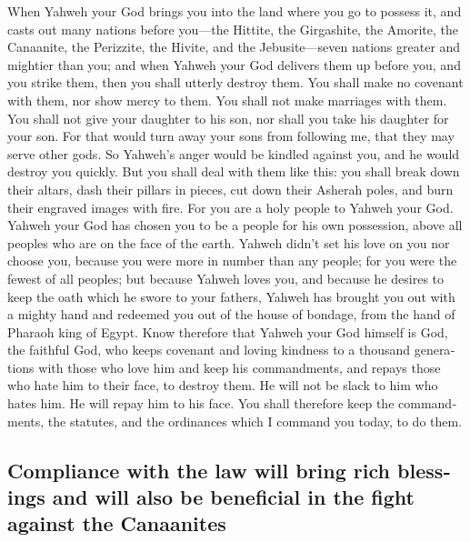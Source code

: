 \begin{paracol}{2}
\begin{otherlanguage}{english}
 When Yahweh your God brings you into the land where you
go to possess it, and casts out many nations before you---the Hittite,
the Girgashite, the Amorite, the Canaanite, the Perizzite, the Hivite,
and the Jebusite---seven nations greater and mightier than you;
 and when Yahweh your God delivers them up before you, and
you strike them, then you shall utterly destroy them. You shall make no
covenant with them, nor show mercy to them.  You shall not
make marriages with them. You shall not give your daughter to his son,
nor shall you take his daughter for your son.  For that
would turn away your sons from following me, that they may serve other
gods. So Yahweh's anger would be kindled against you, and he would
destroy you quickly.  But you shall deal with them like
this: you shall break down their altars, dash their pillars in pieces,
cut down their Asherah poles, and burn their engraved images with fire.
 For you are a holy people to Yahweh your God. Yahweh your
God has chosen you to be a people for his own possession, above all
peoples who are on the face of the earth.  Yahweh didn't
set his love on you nor choose you, because you were more in number than
any people; for you were the fewest of all peoples;  but
because Yahweh loves you, and because he desires to keep the oath which
he swore to your fathers, Yahweh has brought you out with a mighty hand
and redeemed you out of the house of bondage, from the hand of Pharaoh
king of Egypt.  Know therefore that Yahweh your God
himself is God, the faithful God, who keeps covenant and loving kindness
to a thousand generations with those who love him and keep his
commandments,  and repays those who hate him to their
face, to destroy them. He will not be slack to him who hates him. He
will repay him to his face.  You shall therefore keep the
commandments, the statutes, and the ordinances which I command you
today, to do them.

\hypertarget{compliance-with-the-law-will-bring-rich-blessings-and-will-also-be-beneficial-in-the-fight-against-the-canaanites}{%
\subsection{Compliance with the law will bring rich blessings and will
also be beneficial in the fight against the
Canaanites}\label{compliance-with-the-law-will-bring-rich-blessings-and-will-also-be-beneficial-in-the-fight-against-the-canaanites}}


\end{otherlanguage}
\end{paracol}
